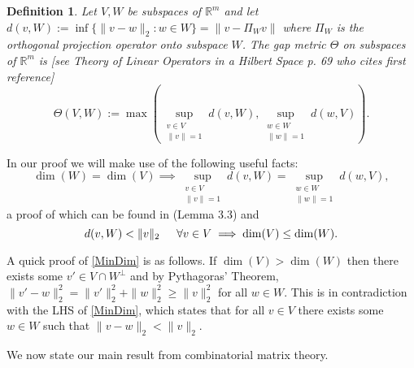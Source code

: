 \documentclass[journal, onecolumn]{IEEEtran}
\newtheorem{definition}{Definition}
\begin{document}
\begin{definition}
Let $V, W$ be subspaces of $\mathbb{R}^m$ and let $d(v,W) := \inf\{\|v-w\|_2: w \in W\} = \|v - \Pi_W v\|$ where $\Pi_W$ is the orthogonal projection operator onto subspace $W$. The \emph{gap} metric $\Theta$ on subspaces of $\mathbb{R}^{m}$ is [see Theory of Linear Operators in a Hilbert Space p. 69 who cites first reference]
\begin{equation}\label{SubspaceMetric}
\Theta(V,W) := \max\left( \sup_{\substack{v \in V \\ \|v\| = 1}} d(v,W), \sup_{\substack{w \in W \\ \|w\| = 1}} d(w,V) \right).
\end{equation}
\end{definition}
%
In our proof we will make use of the following useful facts:
\begin{equation}\label{SubspaceMetricSameDim}
\dim(W) = \dim(V) \implies \sup_{\substack{v \in V \\ \|v\| = 1}}  d(v,W)  = \sup_{\substack{w \in W \\ \|w\| = 1}} d(w,V),
\end{equation}
%
a proof of which can be found in \cite{Morris10} (Lemma 3.3) and
\begin{equation}\label{MinDim}
d(v,W) < \|v\|_2 \indent \forall v \in V \implies \dim(V) \leq \dim(W).
\end{equation}

A quick proof of \eqref{MinDim} is as follows. If $\dim(V) > \dim(W)$ then there exists some $v' \in V \cap W^\perp$ and by Pythagoras' Theorem, $\|v' - w\|_2^2 = \|v'\|_2^2 + \|w\|_2^2 \geq \|v\|_2^2$ for all $w \in W$. This is in contradiction with the LHS of \eqref{MinDim}, which states that for all $v \in V$ there exists some $w \in W$ such that $\|v - w\|_2 < \|v\|_2$.

We now state our main result from combinatorial matrix theory.

\end{document}
